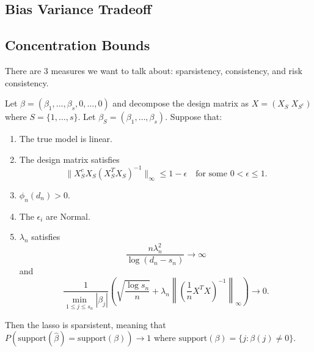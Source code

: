 \subsection{Bias Variance Tradeoff}

\subsection{Concentration Bounds}

  There are 3 measures we want to talk about: sparsistency, consistency, and risk consistency. 

  \begin{theorem}
    Let $\beta = (\beta_1, \ldots, \beta_s, 0, \ldots, 0)$ and decompose the design matrix as $X = (X_S \; X_{S^c})$ where $S = \{1, \ldots, s\}$. Let $\beta_S = (\beta_1, \ldots, \beta_s)$. Suppose that:
    \begin{enumerate}
      \item The true model is linear.
      
      \item The design matrix satisfies
      \begin{equation}
        \|X_S^c X_S (X_S^T X_S)^{-1}\|_{\infty} \leq 1 - \epsilon \quad \text{for some } 0 < \epsilon \leq 1. 
      \end{equation}
      
      \item $\phi_n(d_n) > 0$.
      
      \item The $\epsilon_i$ are Normal.
      
      \item $\lambda_n$ satisfies
      \begin{equation}
        \frac{n\lambda_n^2}{\log(d_n - s_n)} \to \infty
      \end{equation}
      and
      \begin{equation}
        \frac{1}{\min_{1 \leq j \leq s_n} |\beta_j|} \left( \sqrt{\frac{\log s_n}{n}} + \lambda_n \left\| \left( \frac{1}{n} X^T X \right)^{-1} \right\|_{\infty} \right) \to 0. 
      \end{equation}
    \end{enumerate}

    Then the lasso is sparsistent, meaning that $P(\text{support}(\hat{\beta}) = \text{support}(\beta)) \to 1$ where $\text{support}(\beta) = \{j : \beta(j) \neq 0\}$.
  \end{theorem}

